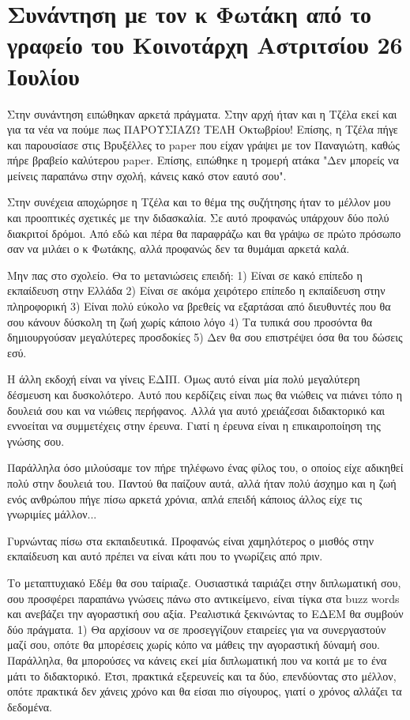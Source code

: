 \documentclass[a4paper,twoside,10pt]{article}
\begin{document}
\section{Συνάντηση με τον κ Φωτάκη από το γραφείο του Κοινοτάρχη Αστριτσίου 26 Ιουλίου}

Στην συνάντηση ειπώθηκαν αρκετά πράγματα. Στην αρχή ήταν και η Τζέλα εκεί και για τα νέα να πούμε πως ΠΑΡΟΥΣΙΑΖΩ ΤΕΛΗ Οκτωβρίου! Επίσης, η Τζέλα πήγε και παρουσίασε στις Βρυξέλλες το paper που είχαν γράψει με τον Παναγιώτη, καθώς πήρε βραβείο καλύτερου paper. Επίσης, ειπώθηκε η τρομερή ατάκα "Δεν μπορείς να μείνεις παραπάνω στην σχολή, κάνεις κακό στον εαυτό σου".

Στην συνέχεια αποχώρησε η Τζέλα και το θέμα της συζήτησης ήταν το μέλλον μου και προοπτικές σχετικές με την διδασκαλία. Σε αυτό προφανώς υπάρχουν δύο πολύ διακριτοί δρόμοι. Από εδώ και πέρα θα παραφράζω και θα γράψω σε πρώτο πρόσωπο σαν να μιλάει ο κ Φωτάκης, αλλά προφανώς δεν τα θυμάμαι αρκετά καλά. 


Μην πας στο σχολείο. Θα το μετανιώσεις επειδή: 1) Είναι σε κακό επίπεδο η εκπαίδευση στην Ελλάδα 2) Είναι σε ακόμα χειρότερο επίπεδο η εκπαίδευση στην πληροφορική 3) Είναι πολύ εύκολο να βρεθείς να εξαρτάσαι από διευθυντές που θα σου κάνουν δύσκολη τη ζωή χωρίς κάποιο λόγο 4) Τα τυπικά σου προσόντα θα δημιουργούσαν μεγαλύτερες προσδοκίες 5) Δεν θα σου επιστρέψει όσα θα του δώσεις εσύ.

Η άλλη εκδοχή είναι να γίνεις ΕΔΙΠ. Όμως αυτό είναι μία πολύ μεγαλύτερη δέσμευση και δυσκολότερο. Αυτό που κερδίζεις είναι πως θα νιώθεις να πιάνει τόπο η δουλειά σου και να νιώθεις περήφανος. Αλλά για αυτό χρειάζεσαι διδακτορικό και εννοείται να συμμετέχεις στην έρευνα. Γιατί η έρευνα είναι η επικαιροποίηση της γνώσης σου. 

Παράλληλα όσο μιλούσαμε τον πήρε τηλέφωνο ένας φίλος του, ο οποίος είχε αδικηθεί πολύ στην δουλειά του. Παντού θα παίζουν αυτά, αλλά ήταν πολύ άσχημο και η ζωή ενός ανθρώπου πήγε πίσω αρκετά χρόνια, απλά επειδή κάποιος άλλος είχε τις γνωριμίες μάλλον...

Γυρνώντας πίσω στα εκπαιδευτικά. Προφανώς είναι χαμηλότερος ο μισθός στην εκπαίδευση και αυτό πρέπει να είναι κάτι που το γνωρίζεις από πριν. 

Το μεταπτυχιακό Εδέμ θα σου ταίριαζε. Ουσιαστικά ταιριάζει στην διπλωματική σου, σου προσφέρει παραπάνω γνώσεις πάνω στο αντικείμενο, είναι τίγκα στα buzz words και ανεβάζει την αγοραστική σου αξία. Ρεαλιστικά ξεκινώντας το ΕΔΕΜ θα συμβούν δύο πράγματα. 1) Θα αρχίσουν να σε προσεγγίζουν εταιρείες για να συνεργαστούν μαζί σου, οπότε θα μπορέσεις χωρίς κόπο να μάθεις την αγοραστική δύναμή σου. Παράλληλα, θα μπορούσες να κάνεις εκεί μία διπλωματική που να κοιτά με το ένα μάτι το διδακτορικό. Έτσι, πρακτικά εξερευνείς και τα δύο, επενδύοντας στο μέλλον, οπότε πρακτικά δεν χάνεις χρόνο και θα είσαι πιο σίγουρος, γιατί ο χρόνος αλλάζει τα δεδομένα. 
\end{document}
